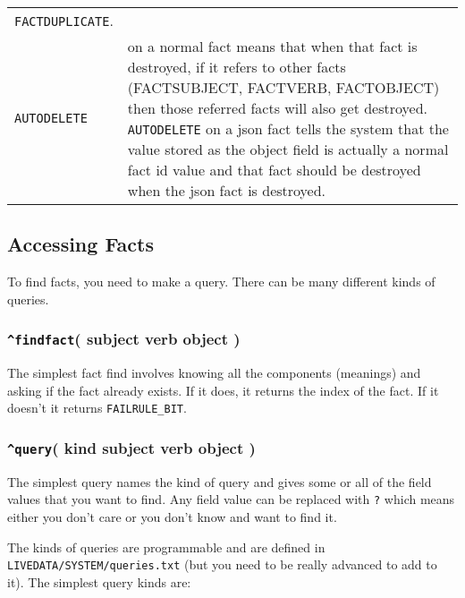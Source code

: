 \documentclass[]{article}
\begin{document}
\begin{longtable}[]{@{}ll@{}}
\begin{minipage}[t]{0.61\columnwidth}
\texttt{FACTDUPLICATE}.\strut
\end{minipage}\tabularnewline
\begin{minipage}[t]{0.21\columnwidth}\raggedright\strut
\texttt{AUTODELETE}\strut
\end{minipage} & \begin{minipage}[t]{0.61\columnwidth}\raggedright\strut
on a normal fact means that when that fact is destroyed, if it refers to
other facts (FACTSUBJECT, FACTVERB, FACTOBJECT) then those referred
facts will also get destroyed. \texttt{AUTODELETE} on a json fact tells
the system that the value stored as the object field is actually a
normal fact id value and that fact should be destroyed when the json
fact is destroyed.\strut
\end{minipage}\tabularnewline
\bottomrule
\end{longtable}

\subsection{Accessing Facts}\label{accessing-facts}

To find facts, you need to make a query. There can be many different
kinds of queries.

\subsubsection{\texorpdfstring{\texttt{\^{}findfact}( subject verb
object
)}{\^{}findfact( subject verb object )}}\label{findfact-subject-verb-object}

The simplest fact find involves knowing all the components (meanings)
and asking if the fact already exists. If it does, it returns the index
of the fact. If it doesn't it returns \texttt{FAILRULE\_BIT}.

\subsubsection{\texorpdfstring{\texttt{\^{}query}( kind subject verb
object
)}{\^{}query( kind subject verb object )}}\label{query-kind-subject-verb-object}

The simplest query names the kind of query and gives some or all of the
field values that you want to find. Any field value can be replaced with
\texttt{?} which means either you don't care or you don't know and want
to find it.

The kinds of queries are programmable and are defined in
\texttt{LIVEDATA/SYSTEM/queries.txt} (but you need to be really advanced
to add to it). The simplest query kinds are:
\end{document}
